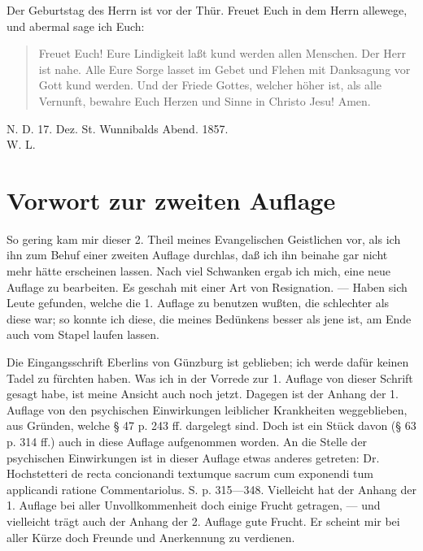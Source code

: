 Der Geburtstag des Herrn ist vor der Thür. Freuet Euch in dem Herrn allewege, und abermal sage ich Euch:

\begin{quote}
Freuet Euch! Eure Lindigkeit laßt kund werden allen Menschen. Der Herr ist nahe. Alle Eure Sorge lasset im Gebet und Flehen mit Danksagung vor Gott kund werden. Und der Friede Gottes, welcher höher ist, als alle Vernunft, bewahre Euch Herzen und Sinne in Christo Jesu! Amen.
\end{quote}

\begin{unterschrift}
N. D. 17. Dez. St. Wunnibalds Abend. 1857.\\[0.8em]
W. L.
\end{unterschrift}

\chapter{Vorwort zur zweiten Auflage}

So gering kam mir dieser 2. Theil meines Evangelischen Geistlichen vor, als ich ihn zum Behuf einer zweiten Auflage durchlas, daß ich ihn beinahe gar nicht mehr hätte erscheinen lassen. Nach viel Schwanken ergab ich mich, eine neue Auflage zu bearbeiten. Es geschah mit einer Art von Resignation. — Haben sich Leute gefunden, welche die 1. Auflage zu benutzen wußten, die schlechter als diese war; so konnte ich diese, die meines Bedünkens besser als jene ist, am Ende auch vom Stapel laufen lassen.

Die Eingangsschrift Eberlins von Günzburg ist geblieben; ich werde dafür keinen Tadel zu fürchten haben. Was ich in der Vorrede zur 1. Auflage von dieser Schrift gesagt habe, ist meine Ansicht auch noch jetzt. Dagegen ist der Anhang der 1. Auflage von den psychischen Einwirkungen leiblicher Krankheiten weggeblieben, aus Gründen, welche § 47 p. 243 ff. dargelegt sind. Doch ist ein Stück davon (§ 63 p. 314 ff.) auch in diese Auflage aufgenommen worden. An die Stelle der psychischen Einwirkungen ist in dieser Auflage etwas
anderes getreten: Dr. Hochstetteri de recta concionandi textumque sacrum cum exponendi tum applicandi ratione Commentariolus. S. p. 315—348. Vielleicht hat der Anhang der 1. Auflage bei aller Unvollkommenheit doch einige Frucht getragen, — und vielleicht trägt auch der Anhang der 2. Auflage gute Frucht. Er scheint mir bei aller Kürze doch Freunde und Anerkennung zu verdienen.

